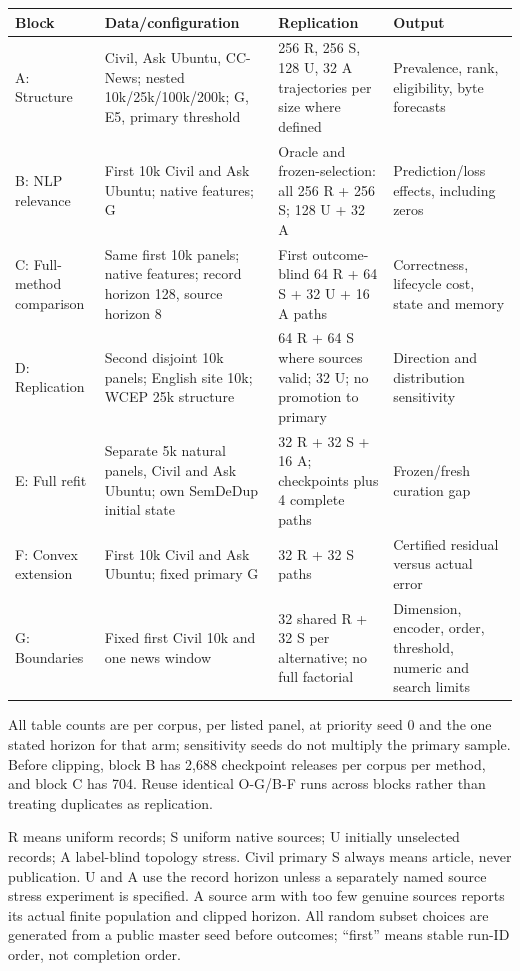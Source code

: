 \documentclass[11pt,a4paper]{article}
\newcommand{\smalltable}{\small\renewcommand{\arraystretch}{1.14}}
\begin{document}
{\smalltable
\begin{longtable}{p{.20\linewidth}p{.29\linewidth}p{.27\linewidth}p{.16\linewidth}}
\toprule Block & Data/configuration & Replication & Output\\\midrule\endhead
A: Structure & Civil, Ask Ubuntu, CC-News; nested 10k/25k/100k/200k; G, E5, primary threshold & 256 R, 256 S, 128 U, 32 A trajectories per size where defined & Prevalence, rank, eligibility, byte forecasts\\
B: NLP relevance & First 10k Civil and Ask Ubuntu; native features; G & Oracle and frozen-selection: all 256 R + 256 S; 128 U + 32 A & Prediction/loss effects, including zeros\\
C: Full-method comparison & Same first 10k panels; native features; record horizon 128, source horizon 8 & First outcome-blind 64 R + 64 S + 32 U + 16 A paths & Correctness, lifecycle cost, state and memory\\
D: Replication & Second disjoint 10k panels; English site 10k; WCEP 25k structure & 64 R + 64 S where sources valid; 32 U; no promotion to primary & Direction and distribution sensitivity\\
E: Full refit & Separate 5k natural panels, Civil and Ask Ubuntu; own SemDeDup initial state & 32 R + 32 S + 16 A; checkpoints plus 4 complete paths & Frozen/fresh curation gap\\
F: Convex extension & First 10k Civil and Ask Ubuntu; fixed primary G & 32 R + 32 S paths & Certified residual versus actual error\\
G: Boundaries & Fixed first Civil 10k and one news window & 32 shared R + 32 S per alternative; no full factorial & Dimension, encoder, order, threshold, numeric and search limits\\
\bottomrule
\end{longtable}}

All table counts are per corpus, per listed panel, at priority seed 0 and the one stated horizon for that arm; sensitivity seeds do not multiply the primary sample. Before clipping, block B has 2,688 checkpoint releases per corpus per method, and block C has 704. Reuse identical O-G/B-F runs across blocks rather than treating duplicates as replication.

R means uniform records; S uniform native sources; U initially unselected records; A label-blind topology stress. Civil primary S always means article, never publication. U and A use the record horizon unless a separately named source stress experiment is specified. A source arm with too few genuine sources reports its actual finite population and clipped horizon. All random subset choices are generated from a public master seed before outcomes; ``first'' means stable run-ID order, not completion order.
\end{document}
